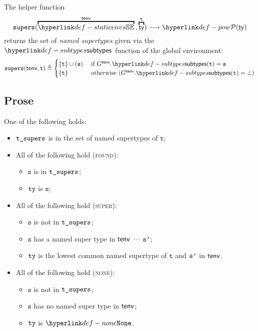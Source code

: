 \documentclass{book}
\newcommand\vt[0]{\texttt{t}}
\newcommand\vs[0]{\texttt{s}}
\begin{document}
\newcommand\supers[0]{\texttt{supers}}
The helper function
\[
  \supers(\overname{\staticenvs}{\tenv} \aslsep \overname{\ty}{\vt})
  \aslto \pow{\ty}
\]
returns the set of \emph{named supertypes} given via the $\subtypes$ function of the global environment:
\[
  \supers(\tenv, \vt) \triangleq
  \begin{cases}
    \{\vt\} \cup (\vs) & \text{ if }G^\tenv.\subtypes(\vt) = \vs\\
    \{\vt\}  & \text{ otherwise } (G^\tenv.\subtypes(\vt) = \bot)\\
  \end{cases}
\]

\subsection{Prose}
One of the following holds:
\begin{itemize}
  \item $\texttt{t\_supers}$ is in the set of named supertypes of $\vt$;
  \item All of the following hold (\textsc{found}):
  \begin{itemize}
    \item $\vs$ is in $\texttt{t\_supers}$;
    \item $\texttt{ty}$ is $\vs$;
  \end{itemize}

  \item All of the following hold (\textsc{super}):
  \begin{itemize}
    \item $\vs$ is not in $\texttt{t\_supers}$;
    \item $\vs$ has a named super type in $\textsf{tenv}$ --- $\texttt{s'}$;
    \item $\texttt{ty}$ is the lowest common named supertype of $\vt$ and $\texttt{s'}$ in $\textsf{tenv}$.
  \end{itemize}

  \item All of the following hold (\textsc{none}):
  \begin{itemize}
    \item $\vs$ is not in $\texttt{t\_supers}$;
    \item $\vs$ has no named super type in $\textsf{tenv}$;
    \item $\texttt{ty}$ is $\None$.
  \end{itemize}
\end{itemize}
\end{document}
